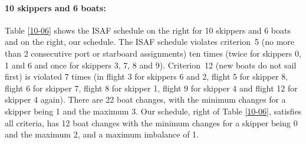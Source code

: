 \documentclass{llncs}
\begin{document}
\paragraph{10 skippers and 6 boats:} Table \ref{10-06} shows the ISAF schedule on the right for 10
skippers and 6 boats and on the right, our schedule.  The ISAF schedule violates criterion~5 (no more
than 2 consecutive port or starboard assignments) ten times (twice for skippers 0, 1 and 6 and once
for skippers 3, 7, 8 and 9).  Criterion~12 (new boats do not sail first) is violated 7 times (in
flight 3 for skippers 6 and 2, flight 5 for skipper 8, flight 6 for skipper 7, flight 8 for skipper
1, flight 9 for skipper 4 and flight 12 for skipper 4 again). There are 22 boat changes, with the
minimum changes for a skipper being 1 and the maximum 3. Our schedule, right of Table \ref{10-06},
satisfies all criteria, has 12 boat changes with the minimum changes for a skipper being 0 and the
maximum 2, and a maximum imbalance of 1.
\end{document}

